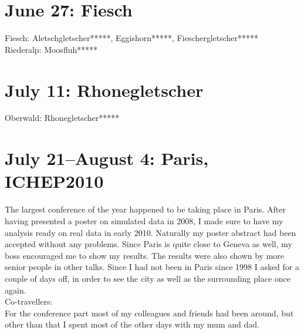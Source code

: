 \section{June 27: Fiesch}
\label{Fiesch2010}

Fiesch: Aletschgletscher*****, Eggishorn*****, Fieschergletscher*****\\
Riederalp: Moosfluh*****

\section{July 11: Rhonegletscher}
\label{Rhonegletscher2010}

Oberwald: Rhonegletscher*****

\section{July 21--August 4: Paris, ICHEP2010}
\label{Paris2010}

The largest conference of the year happened to be taking place in Paris. After having presented a poster on simulated data in 2008, I made sure to have my analysis ready on real data in early 2010. Naturally my poster abstract had been accepted without any problems. Since Paris is quite close to Geneva as well, my boss encouraged me to show my results. The results were also shown by more senior people in other talks. Since I had not been in Paris since 1998 I asked for a couple of days off, in order to see the city as well as the surrounding place once again.\\

Co-travellers:\\
For the conference part most of my colleagues and friends had been around, but other than that I spent most of the other days with my mum and dad.\\


